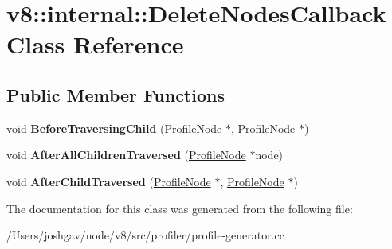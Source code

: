 \hypertarget{classv8_1_1internal_1_1_delete_nodes_callback}{}\section{v8\+:\+:internal\+:\+:Delete\+Nodes\+Callback Class Reference}
\label{classv8_1_1internal_1_1_delete_nodes_callback}
\subsection*{Public Member Functions}
\begin{DoxyCompactItemize}
\item 
void {\bfseries Before\+Traversing\+Child} (\hyperlink{classv8_1_1internal_1_1_profile_node}{Profile\+Node} $\ast$, \hyperlink{classv8_1_1internal_1_1_profile_node}{Profile\+Node} $\ast$)\hypertarget{classv8_1_1internal_1_1_delete_nodes_callback_abedf62098500aa0f61137db8e47430fe}{}\label{classv8_1_1internal_1_1_delete_nodes_callback_abedf62098500aa0f61137db8e47430fe}

\item 
void {\bfseries After\+All\+Children\+Traversed} (\hyperlink{classv8_1_1internal_1_1_profile_node}{Profile\+Node} $\ast$node)\hypertarget{classv8_1_1internal_1_1_delete_nodes_callback_aaf4155f73f4855c26b2ecee5740eadbb}{}\label{classv8_1_1internal_1_1_delete_nodes_callback_aaf4155f73f4855c26b2ecee5740eadbb}

\item 
void {\bfseries After\+Child\+Traversed} (\hyperlink{classv8_1_1internal_1_1_profile_node}{Profile\+Node} $\ast$, \hyperlink{classv8_1_1internal_1_1_profile_node}{Profile\+Node} $\ast$)\hypertarget{classv8_1_1internal_1_1_delete_nodes_callback_a59823e985d117a4d8429e0d198f288bf}{}\label{classv8_1_1internal_1_1_delete_nodes_callback_a59823e985d117a4d8429e0d198f288bf}

\end{DoxyCompactItemize}


The documentation for this class was generated from the following file\+:\begin{DoxyCompactItemize}
\item 
/\+Users/joshgav/node/v8/src/profiler/profile-\/generator.\+cc\end{DoxyCompactItemize}
